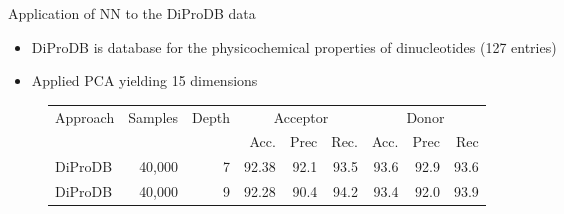 \documentclass[10pt]{beamer}
\begin{document}
\begin{frame}{Application of NN to the DiProDB data}
	\begin{itemize}
		\item DiProDB is database for the physicochemical properties of dinucleotides (127 entries)
		\item Applied PCA yielding 15 dimensions
	\end{itemize}
	\pause
		\begin{figure}
		\small
		\centering
		\begingroup
		\def\arraystretch{1.2}
		\begin{tabular}{|l|r|r|r|r|r|r|r|r|}
			\hline
			Approach & Samples & Depth & \multicolumn{3}{c|}{Acceptor} & \multicolumn{3}{c|}{Donor} \\
			\cline{4-9}
			&&& Acc. & Prec & Rec. & Acc. & Prec & Rec \\
			\hline
			DiProDB & 40,000 & 7 & 92.38 & 92.1 & 93.5 & 93.6 & 92.9 & 93.6 \\
			DiProDB & 40,000 & 9 & 92.28 & 90.4 & 94.2 & 93.4 & 92.0 & 93.9 \\
			
			\hline  
		\end{tabular}
		\endgroup
	\end{figure}
\end{frame}
\end{document}
